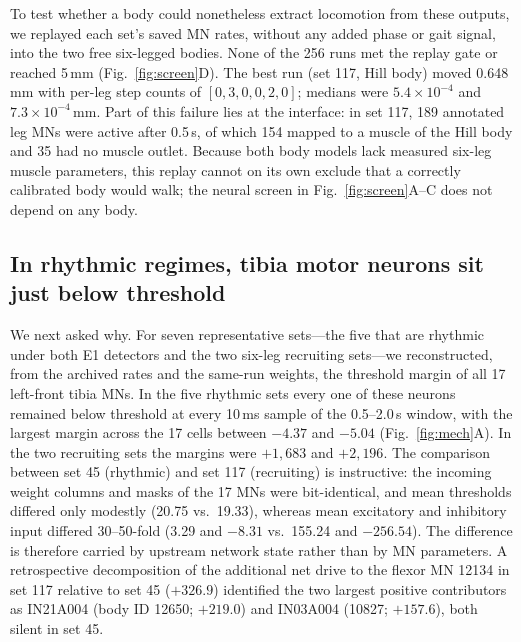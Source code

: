 \documentclass[11pt]{article}
\begin{document}
To test whether a body could nonetheless extract locomotion from these outputs, we replayed each set's saved MN rates, without any added phase or gait signal, into the two free six-legged bodies. None of the 256 runs met the replay gate or reached 5\,mm (Fig.~\ref{fig:screen}D). The best run (set 117, Hill body) moved 0.648\,mm with per-leg step counts of $[0,3,0,0,2,0]$; medians were $5.4\times10^{-4}$ and $7.3\times10^{-4}$\,mm. Part of this failure lies at the interface: in set 117, 189 annotated leg MNs were active after 0.5\,s, of which 154 mapped to a muscle of the Hill body and 35 had no muscle outlet. Because both body models lack measured six-leg muscle parameters, this replay cannot on its own exclude that a correctly calibrated body would walk; the neural screen in Fig.~\ref{fig:screen}A--C does not depend on any body.

\subsection{In rhythmic regimes, tibia motor neurons sit just below threshold}
\label{sec:r2}
We next asked why. For seven representative sets---the five that are rhythmic under both E1 detectors and the two six-leg recruiting sets---we reconstructed, from the archived rates and the same-run weights, the threshold margin of all 17 left-front tibia MNs. In the five rhythmic sets every one of these neurons remained below threshold at every 10\,ms sample of the 0.5--2.0\,s window, with the largest margin across the 17 cells between $-4.37$ and $-5.04$ (Fig.~\ref{fig:mech}A). In the two recruiting sets the margins were $+1{,}683$ and $+2{,}196$. The comparison between set 45 (rhythmic) and set 117 (recruiting) is instructive: the incoming weight columns and masks of the 17 MNs were bit-identical, and mean thresholds differed only modestly (20.75 vs.\ 19.33), whereas mean excitatory and inhibitory input differed 30--50-fold (3.29 and $-8.31$ vs.\ 155.24 and $-256.54$). The difference is therefore carried by upstream network state rather than by MN parameters. A retrospective decomposition of the additional net drive to the flexor MN 12134 in set 117 relative to set 45 ($+326.9$) identified the two largest positive contributors as IN21A004 (body ID 12650; $+219.0$) and IN03A004 (10827; $+157.6$), both silent in set 45.
\end{document}
